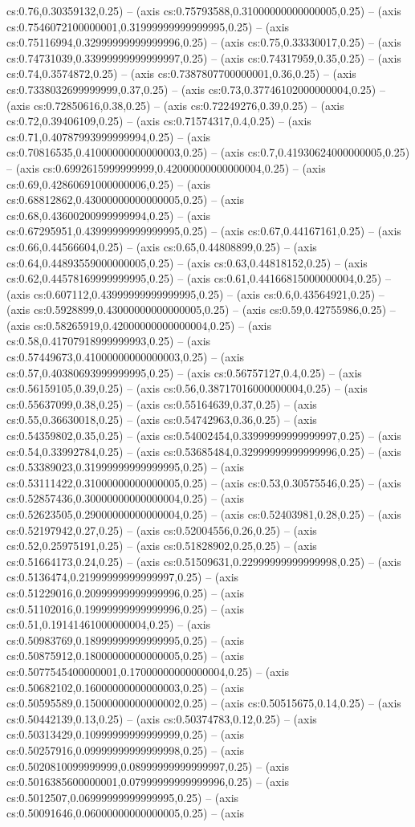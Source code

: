 cs:0.76,0.30359132,0.25) -- (axis cs:0.75793588,0.31000000000000005,0.25) -- (axis cs:0.7546072100000001,0.31999999999999995,0.25) -- (axis cs:0.75116994,0.32999999999999996,0.25) -- (axis cs:0.75,0.33330017,0.25) -- (axis cs:0.74731039,0.33999999999999997,0.25) -- (axis cs:0.74317959,0.35,0.25) -- (axis cs:0.74,0.3574872,0.25) -- (axis cs:0.7387807700000001,0.36,0.25) -- (axis cs:0.7338032699999999,0.37,0.25) -- (axis cs:0.73,0.37746102000000004,0.25) -- (axis cs:0.72850616,0.38,0.25) -- (axis cs:0.72249276,0.39,0.25) -- (axis cs:0.72,0.39406109,0.25) -- (axis cs:0.71574317,0.4,0.25) -- (axis cs:0.71,0.40787993999999994,0.25) -- (axis cs:0.70816535,0.41000000000000003,0.25) -- (axis cs:0.7,0.41930624000000005,0.25) -- (axis cs:0.6992615999999999,0.42000000000000004,0.25) -- (axis cs:0.69,0.42860691000000006,0.25) -- (axis cs:0.68812862,0.43000000000000005,0.25) -- (axis cs:0.68,0.43600200999999994,0.25) -- (axis cs:0.67295951,0.43999999999999995,0.25) -- (axis cs:0.67,0.44167161,0.25) -- (axis cs:0.66,0.44566604,0.25) -- (axis cs:0.65,0.44808899,0.25) -- (axis cs:0.64,0.44893559000000005,0.25) -- (axis cs:0.63,0.44818152,0.25) -- (axis cs:0.62,0.44578169999999995,0.25) -- (axis cs:0.61,0.44166815000000004,0.25) -- (axis cs:0.607112,0.43999999999999995,0.25) -- (axis cs:0.6,0.43564921,0.25) -- (axis cs:0.5928899,0.43000000000000005,0.25) -- (axis cs:0.59,0.42755986,0.25) -- (axis cs:0.58265919,0.42000000000000004,0.25) -- (axis cs:0.58,0.41707918999999993,0.25) -- (axis cs:0.57449673,0.41000000000000003,0.25) -- (axis cs:0.57,0.40380693999999995,0.25) -- (axis cs:0.56757127,0.4,0.25) -- (axis cs:0.56159105,0.39,0.25) -- (axis cs:0.56,0.38717016000000004,0.25) -- (axis cs:0.55637099,0.38,0.25) -- (axis cs:0.55164639,0.37,0.25) -- (axis cs:0.55,0.36630018,0.25) -- (axis cs:0.54742963,0.36,0.25) -- (axis cs:0.54359802,0.35,0.25) -- (axis cs:0.54002454,0.33999999999999997,0.25) -- (axis cs:0.54,0.33992784,0.25) -- (axis cs:0.53685484,0.32999999999999996,0.25) -- (axis cs:0.53389023,0.31999999999999995,0.25) -- (axis cs:0.53111422,0.31000000000000005,0.25) -- (axis cs:0.53,0.30575546,0.25) -- (axis cs:0.52857436,0.30000000000000004,0.25) -- (axis cs:0.52623505,0.29000000000000004,0.25) -- (axis cs:0.52403981,0.28,0.25) -- (axis cs:0.52197942,0.27,0.25) -- (axis cs:0.52004556,0.26,0.25) -- (axis cs:0.52,0.25975191,0.25) -- (axis cs:0.51828902,0.25,0.25) -- (axis cs:0.51664173,0.24,0.25) -- (axis cs:0.51509631,0.22999999999999998,0.25) -- (axis cs:0.5136474,0.21999999999999997,0.25) -- (axis cs:0.51229016,0.20999999999999996,0.25) -- (axis cs:0.51102016,0.19999999999999996,0.25) -- (axis cs:0.51,0.19141461000000004,0.25) -- (axis cs:0.50983769,0.18999999999999995,0.25) -- (axis cs:0.50875912,0.18000000000000005,0.25) -- (axis cs:0.5077545400000001,0.17000000000000004,0.25) -- (axis cs:0.50682102,0.16000000000000003,0.25) -- (axis cs:0.50595589,0.15000000000000002,0.25) -- (axis cs:0.50515675,0.14,0.25) -- (axis cs:0.50442139,0.13,0.25) -- (axis cs:0.50374783,0.12,0.25) -- (axis cs:0.50313429,0.10999999999999999,0.25) -- (axis cs:0.50257916,0.09999999999999998,0.25) -- (axis cs:0.5020810099999999,0.08999999999999997,0.25) -- (axis cs:0.5016385600000001,0.07999999999999996,0.25) -- (axis cs:0.5012507,0.06999999999999995,0.25) -- (axis cs:0.50091646,0.06000000000000005,0.25) -- (axis 